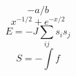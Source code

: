 \documentclass{article}
\begin{document}
\[ -a/b \]
\[ x^{-1/2} + e^{-x/2} \]
\[ E = -J\sum_{ij} s_i s_j \]
\[ S = -\int f \]
\end{document}
